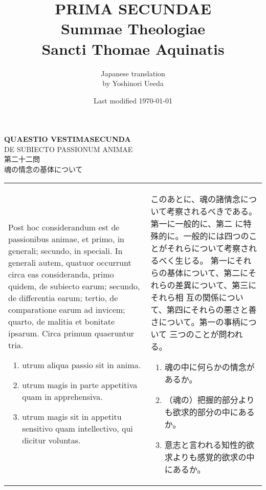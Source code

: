 \documentclass[10pt]{jsarticle} %
\title{{\bf PRIMA SECUNDAE}\\{\HUGE Summae Theologiae}\\Sancti Thomae
Aquinatis}
\author{Japanese translation\\by Yoshinori {\sc Ueeda}}
\date{Last modified \today}
\begin{document}
\maketitle
\pagestyle{fancy}


\begin{center}
 {\Large {\bf QUAESTIO VESTIMASECUNDA}}\\
 {\large DE SUBIECTO PASSIONUM ANIMAE}\\

 {\Large 第二十二問\\魂の情念の基体について}
\end{center}

\begin{longtable}{p{21em}p{21em}}
Post hoc considerandum est de passionibus animae, et primo, in generali;
 secundo, in speciali. In generali autem, quatuor occurrunt circa eas
 consideranda, primo quidem, de subiecto earum; secundo, de differentia
 earum; tertio, de comparatione earum ad invicem; quarto, de malitia et
 bonitate ipsarum. Circa primum quaeruntur tria. 


\begin{enumerate}
 \item utrum aliqua passio sit in anima.
 \item utrum magis in parte appetitiva quam in apprehensiva.
 \item utrum magis sit in appetitu sensitivo quam intellectivo, qui dicitur voluntas.
\end{enumerate}
 

 
&

このあとに、魂の諸情念について考察されるべきである。第一に一般的に、第二
 に特殊的に。一般的には四つのことがそれらについて考察されるべく生じる。
 第一にそれらの基体について、第二にそれらの差異について、第三にそれら相
 互の関係について、第四にそれらの悪さと善さについて。第一の事柄について
 三つのことが問われる。


 \begin{enumerate}
  \item 魂の中に何らかの情念があるか。
  \item （魂の）把握的部分よりも欲求的部分の中にあるか。
  \item 意志と言われる知性的欲求よりも感覚的欲求の中にあるか。
 \end{enumerate}

\end{longtable}
\end{document}
